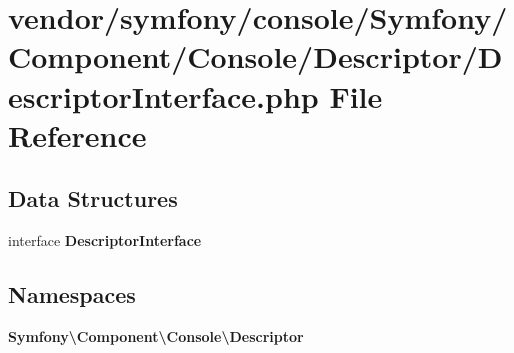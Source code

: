 \section{vendor/symfony/console/\+Symfony/\+Component/\+Console/\+Descriptor/\+Descriptor\+Interface.php File Reference}
\label{_descriptor_interface_8php}
\subsection*{Data Structures}
\begin{DoxyCompactItemize}
\item 
interface {\bf Descriptor\+Interface}
\end{DoxyCompactItemize}
\subsection*{Namespaces}
\begin{DoxyCompactItemize}
\item 
 {\bf Symfony\textbackslash{}\+Component\textbackslash{}\+Console\textbackslash{}\+Descriptor}
\end{DoxyCompactItemize}
